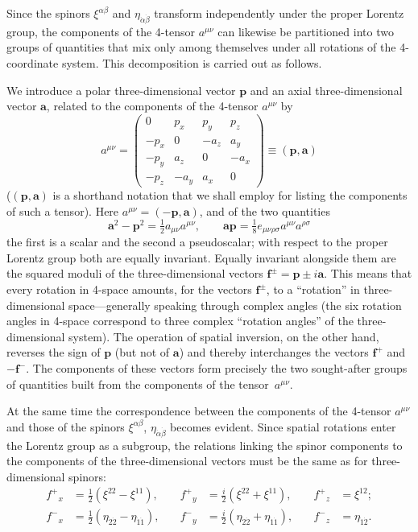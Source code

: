Since the spinors $\xi^{\alpha\beta}$ and $\eta_{\dot\alpha\dot\beta}$ transform independently under the proper Lorentz group, the components of the 4-tensor $a^{\mu\nu}$ can likewise be partitioned into two groups of quantities that mix only among themselves under all rotations of the 4-coordinate system. This decomposition is carried out as follows.

We introduce a polar three-dimensional vector $\mathbf{p}$ and an axial three-dimensional vector $\mathbf{a}$, related to the components of the 4-tensor $a^{\mu\nu}$ by
\begin{equation}
a^{\mu\nu} = \begin{pmatrix} 0 & p_x & p_y & p_z\\ -p_x & 0 & -a_z & a_y\\ -p_y & a_z & 0 & -a_x\\ -p_z & -a_y & a_x & 0 \end{pmatrix} \equiv (\mathbf{p}, \mathbf{a})
\tag{19.15}
\end{equation}
($(\mathbf{p}, \mathbf{a})$ is a shorthand notation that we shall employ for listing the components of such a tensor). Here $a^{\mu\nu}\!=\!(-\mathbf{p}, \mathbf{a})$, and of the two quantities
\[
\mathbf{a}^2 - \mathbf{p}^2 = \tfrac{1}{2}a_{\mu\nu}a^{\mu\nu},\qquad \mathbf{a}\mathbf{p} = \tfrac{1}{8}e_{\mu\nu\rho\sigma}a^{\mu\nu}a^{\rho\sigma}
\]
the first is a scalar and the second a pseudoscalar; with respect to the proper Lorentz group both are equally invariant. Equally invariant alongside them are the squared moduli of the three-dimensional vectors $\mathbf{f}^\pm = \mathbf{p} \pm i\mathbf{a}$. This means that every rotation in 4-space amounts, for the vectors $\mathbf{f}^\pm$, to a ``rotation'' in three-dimensional space---generally speaking through complex angles (the six rotation angles in 4-space correspond to three complex ``rotation angles'' of the three-dimensional system). The operation of spatial inversion, on the other hand, reverses the sign of $\mathbf{p}$ (but not of $\mathbf{a}$) and thereby interchanges the vectors $\mathbf{f}^+$ and $-\mathbf{f}^-$. The components of these vectors form precisely the two sought-after groups of quantities built from the components of the tensor~$a^{\mu\nu}$.

At the same time the correspondence between the components of the 4-tensor $a^{\mu\nu}$ and those of the spinors $\xi^{\alpha\beta}$, $\eta_{\dot\alpha\dot\beta}$ becomes evident. Since spatial rotations enter the Lorentz group as a subgroup, the relations linking the spinor components to the components of the
three-dimensional vectors must be the same as for three-dimensional spinors:
\begin{equation}
\begin{aligned}
f^+{}_x &= \tfrac{1}{2}(\xi^{22} - \xi^{11}), &\quad f^+{}_y &= \tfrac{i}{2}(\xi^{22} + \xi^{11}), &\quad f^+{}_z &= \xi^{12};\\
f^-{}_x &= \tfrac{1}{2}(\eta_{\dot 2\dot 2} - \eta_{\dot 1\dot 1}), &\quad f^-{}_y &= \tfrac{i}{2}(\eta_{\dot 2\dot 2} + \eta_{\dot 1\dot 1}), &\quad f^-{}_z &= \eta_{\dot 1\dot 2}.
\end{aligned}
\tag{19.16}
\end{equation}

